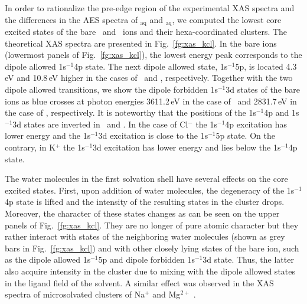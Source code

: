In order to rationalize the pre-edge region of the experimental XAS spectra and the differences in the AES spectra of \ki$_{\text{aq}}$ and \cli$_{\text{aq}}$, we computed the lowest core excited states of the bare \ki~and \cli~ions and their hexa-coordinated clusters. The theoretical XAS spectra are presented in Fig.\ \ref{fg:xas_kcl}. In the bare ions (lowermost panels of Fig.\ \ref{fg:xas_kcl}), the lowest energy peak corresponds to the dipole allowed 1s$^{-1}$4p state. The next dipole allowed state, 1s$^{-1}$5p, is located 4.3\,eV and 10.8\,eV higher in the cases of \ki~and \cli, respectively. Together with the two dipole allowed transitions, we show the dipole forbidden 1s$^{-1}$3d states of the bare ions as blue crosses at photon energies 3611.2\,eV in the case of \ki~and 2831.7\,eV in the case of \cli, respectively. It is noteworthy that the positions of the 1s$^{-1}$4p and 1s$^{-1}$3d states are inverted in \ki~and \cli. In the case of Cl$^{-}$ the 1s$^{-1}$4p excitation has lower energy and the 1s$^{-1}$3d excitation is close to the 1s$^{-1}$5p state. On the contrary, in K$^{+}$ the 1s$^{-1}$3d excitation has lower energy and lies below the 1s$^{-1}$4p state. %


The water molecules in the first solvation shell have several effects on the core excited states. First, upon addition of water molecules, the degeneracy of the 1s$^{-1}$4p state is lifted and the intensity of the resulting states in the cluster drops. Moreover, the character of these states changes as can be seen on the upper panels of Fig.\ \ref{fg:xas_kcl}. They are no longer of pure atomic character but they rather interact with states of the neighboring water molecules (shown as grey bars in Fig.\ \ref{fg:xas_kcl}) and with other closely lying states of the bare ion, such as the dipole allowed 1s$^{-1}$5p and dipole forbidden 1s$^{-1}$3d state. Thus, the latter also acquire intensity in the cluster due to mixing with the dipole allowed states in the ligand field of the solvent. A similar effect was observed in the XAS spectra of microsolvated clusters of Na$^{+}$ and Mg$^{2+}$ \citep{miteva16:16671}.


